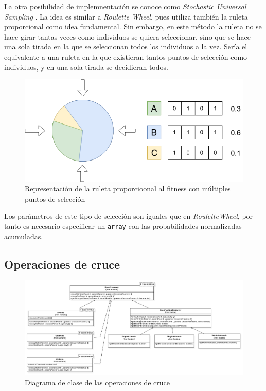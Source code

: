 La otra posibilidad de implemnentación se conoce como \textit{Stochastic Universal Sampling} \cite{baker1987reducing}. La idea es similar a \textit{Roulette Wheel}, pues utiliza también la ruleta proporcional como idea fundamental. Sin embargo, en este método la ruleta no se hace girar tantas veces como individuos se quiera seleccionar, sino que se hace una sola tirada en la que se seleccionan todos los individuos a la vez. Sería el equivalente a una ruleta en la que existieran tantos puntos de selección como individuos, y en una sola tirada se decidieran todos. \\

\begin{figure}[H]
    \centering
    \includegraphics[scale=0.5]{mem/images/cap-4/4.2.5(Selection)/SUS-1.png}
    \caption{Representación de la ruleta proporcioonal al fitness con múltiples puntos de selección}
    \label{fig:roulette-wheel-example}
\end{figure}

Los parámetros de este tipo de selección son iguales que en \textit{RouletteWheel}, por tanto es necesario especificar un \texttt{array} con las probabilidades normalizadas acumuladas.

\subsection{Operaciones de cruce}

\begin{figure}[ht]
    \centering
    \includegraphics[scale=0.2]{mem/images/cap-4/4.2.6(Crossover)/Crossover.png}
    \caption{Diagrama de clase de las operaciones de cruce}
    \label{fig:my_label}
\end{figure}

